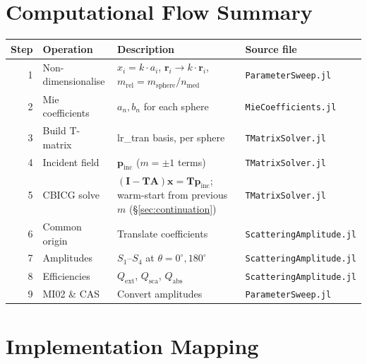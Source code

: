 \documentclass[11pt,a4paper]{article}
\begin{document}
\section{Computational Flow Summary}
\label{sec:flow}

\begin{center}
\begin{tabular}{@{} rlll @{}}
  \toprule
  Step & Operation & Description & Source file \\
  \midrule
  1 & Non-dimensionalise & $x_i = k \cdot a_i$, $\bm{r}_i \to k \cdot \bm{r}_i$, $m_\mathrm{rel} = m_\mathrm{sphere}/n_\mathrm{med}$ & \texttt{ParameterSweep.jl} \\
  2 & Mie coefficients & $a_n, b_n$ for each sphere & \texttt{MieCoefficients.jl} \\
  3 & Build T-matrix & lr\_tran basis, per sphere & \texttt{TMatrixSolver.jl} \\
  4 & Incident field & $\bm{p}_\mathrm{inc}$ ($m = \pm 1$ terms) & \texttt{TMatrixSolver.jl} \\
  5 & CBICG solve & $(\mathbf{I} - \mathbf{T}\mathbf{A})\bm{x} = \mathbf{T}\bm{p}_\mathrm{inc}$; warm-start from previous $m$ (\S\ref{sec:continuation}) & \texttt{TMatrixSolver.jl} \\
  6 & Common origin & Translate coefficients & \texttt{ScatteringAmplitude.jl} \\
  7 & Amplitudes & $S_1$--$S_4$ at $\theta = 0^\circ, 180^\circ$ & \texttt{ScatteringAmplitude.jl} \\
  8 & Efficiencies & $Q_\mathrm{ext}$, $Q_\mathrm{sca}$, $Q_\mathrm{abs}$ & \texttt{ScatteringAmplitude.jl} \\
  9 & MI02 \& CAS & Convert amplitudes & \texttt{ParameterSweep.jl} \\
  \bottomrule
\end{tabular}
\end{center}

\section{Implementation Mapping}
\label{sec:mapping}
\end{document}
